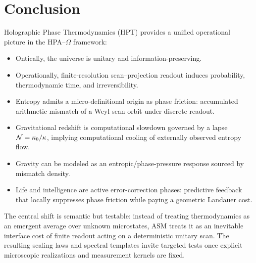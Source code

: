 \section{Conclusion}
\label{sec:conclusion}

Holographic Phase Thermodynamics (HPT) provides a unified operational picture in the HPA--$\Omega$ framework:
\begin{itemize}
  \item Ontically, the universe is unitary and information-preserving.
  \item Operationally, finite-resolution scan--projection readout induces probability, thermodynamic time, and irreversibility.
  \item Entropy admits a micro-definitional origin as phase friction: accumulated arithmetic mismatch of a Weyl scan orbit under discrete readout.
  \item Gravitational redshift is computational slowdown governed by a lapse $\mathcal{N}=\kappa_0/\kappa$, implying computational cooling of externally observed entropy flow.
  \item Gravity can be modeled as an entropic/phase-pressure response sourced by mismatch density.
  \item Life and intelligence are active error-correction phases: predictive feedback that locally suppresses phase friction while paying a geometric Landauer cost.
\end{itemize}

The central shift is semantic but testable: instead of treating thermodynamics as an emergent average over unknown microstates, ASM treats it as an inevitable interface cost of finite readout acting on a deterministic unitary scan. The resulting scaling laws and spectral templates invite targeted tests once explicit microscopic realizations and measurement kernels are fixed.



